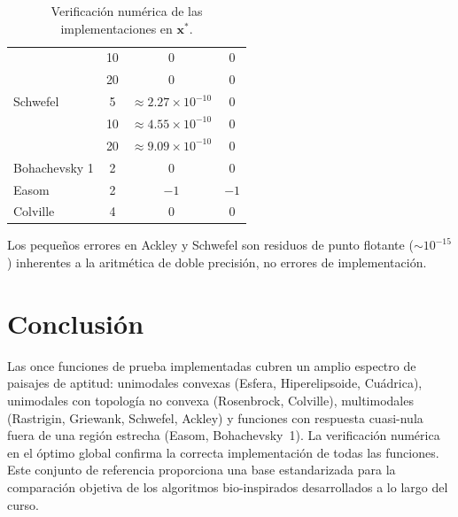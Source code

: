 \documentclass[11pt]{article}
\begin{document}
\begin{table}[H]
\begin{tabular}{lccc}
                 & 10   & $0$                    & 0 \\
                 & 20   & $0$                    & 0 \\
\hline
Schwefel         & 5    & $\approx 2.27\times10^{-10}$ & 0 \\
                 & 10   & $\approx 4.55\times10^{-10}$ & 0 \\
                 & 20   & $\approx 9.09\times10^{-10}$ & 0 \\
\hline
Bohachevsky 1    & 2    & $0$                    & 0 \\
Easom            & 2    & $-1$                   & $-1$ \\
Colville         & 4    & $0$                    & 0 \\
\hline\hline
\end{tabular}
\caption{Verificaci\'on num\'erica de las implementaciones en $\mathbf{x}^*$.}
\end{table}

Los peque\~nos errores en Ackley y Schwefel son residuos de punto flotante ($\sim10^{-15}$) inherentes a la aritm\'etica de doble precisi\'on, no errores de implementaci\'on.

\section{Conclusi\'on}

Las once funciones de prueba implementadas cubren un amplio espectro de paisajes de aptitud: unimodales convexas (Esfera, Hiperelipsoide, Cu\'adrica), unimodales con topolog\'ia no convexa (Rosenbrock, Colville), multimodales (Rastrigin, Griewank, Schwefel, Ackley) y funciones con respuesta cuasi-nula fuera de una regi\'on estrecha (Easom, Bohachevsky~1). La verificaci\'on num\'erica en el \'optimo global confirma la correcta implementaci\'on de todas las funciones. Este conjunto de referencia proporciona una base estandarizada para la comparaci\'on objetiva de los algoritmos bio-inspirados desarrollados a lo largo del curso.
\end{document}
